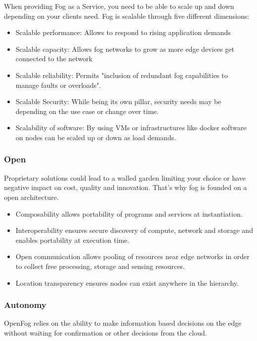 When providing Fog as a Service, you need to be able to scale up and down depending on your clients need. Fog is scalable through five different dimensions:\cite[p. 10]{OpenFog}
\begin{itemize}
	\item Scalable performance: Allows to respond to rising application demands
	\item Scalable capacity: Allows fog networks to grow as more edge devices get connected to the network
	\item Scalable reliability: Permits "inclusion of redundant fog capabilities to manage faults or overloads".
	\item Scalable Security: While being its own pillar, security needs may be depending on the use case or change over time.
	\item Scalability of software: By using VMs or infrastructures like docker software on nodes can be scaled up or down as load demands.
\end{itemize}

\subsubsection{Open}

Proprietary solutions could lead to a walled garden limiting your choice or have negative impact on cost, quality and innovation. That's why fog is founded on a open architecture.\cite[p. 11]{OpenFog}

\begin{itemize}
	\item Composability allows portability of programs and services at instantiation. 
	\item Interoperability ensures secure discovery of compute, network and storage and enables portability at execution time.
	\item Open communication allows pooling of resources near edge networks in order to collect free processing, storage and sensing resources.
	\item Location transparency ensures nodes can exist anywhere in the hierarchy.
\end{itemize}

\subsubsection{Autonomy}

OpenFog relies on the ability to make information based decisions on the edge without waiting for confirmation or other decisions from the cloud.\cite[p. 12]{OpenFog}

